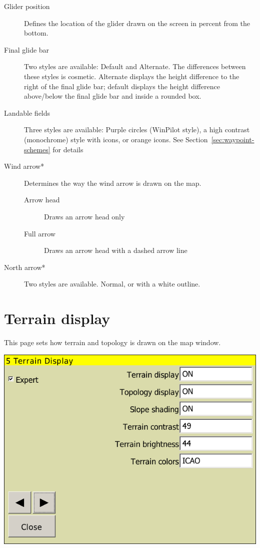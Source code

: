 \begin{description}
\item[Glider position] \label{conf:gliderposition} Defines the location of the
glider drawn on the screen in percent from the bottom. 

\item[Final glide bar]  Two styles are available: Default and
Alternate. The differences between these styles is cosmetic.  Alternate displays the height difference to the 
right of the final glide bar; default displays the height difference above/below the final glide bar and inside a 
rounded box.
\item[Landable fields] \label{conf:waypointicons} Three styles are available:
Purple circles (WinPilot style), a high contrast (monochrome) style with icons,
or orange icons. See Section~\ref{sec:waypoint-schemes} for details

\item[Wind arrow*]  Determines the way the wind arrow is drawn on the map.
\begin{description}
\item[Arrow head] Draws an arrow head only
\item[Full arrow] Draws an arrow head with a dashed arrow line
\end{description}
\item[North arrow*]  Two styles are available.  Normal, or with a white outline.
\end{description}

\clearpage
\section{Terrain display}\label{sec:terrain-display}

This page sets how terrain and topology is drawn on the map window.

\begin{center}
\includegraphics[angle=0,width=0.8\linewidth,keepaspectratio='true']{figures/config-terrain.png}
\end{center}

